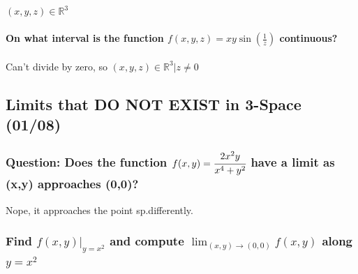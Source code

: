 \documentclass[
  letterpaper,
  DIV=11,
  numbers=noendperiod]{scrartcl}
\let\oldparagraph\paragraph
\renewcommand{\paragraph}[1]{\oldparagraph{#1}\mbox{}}
\begin{document}
\((x, y, z) \in \mathbb{R}^3\)

\hypertarget{on-what-interval-is-the-function-fx-y-z-xysinleftfrac1zright-continuous}{%
\paragraph{\texorpdfstring{On what interval is the function
\(f(x, y, z) = xy\sin\left(\frac{1}{z}\right)\)
continuous?}{On what interval is the function f(x, y, z) = xy\textbackslash sin\textbackslash left(\textbackslash frac\{1\}\{z\}\textbackslash right) continuous?}}\label{on-what-interval-is-the-function-fx-y-z-xysinleftfrac1zright-continuous}}

Can't divide by zero, so \((x, y, z) \in \mathbb{R}^3 | z \ne 0\)

\hypertarget{limits-that-do-not-exist-in-3-space-0108}{%
\subsection{Limits that DO NOT EXIST in 3-Space
(01/08)}\label{limits-that-do-not-exist-in-3-space-0108}}

\hypertarget{question-does-the-function-fxy-cfrac2x2yx4y2-have-a-limit-as-xy-approaches-00}{%
\subsubsection{\texorpdfstring{Question: Does the function
\(f(x,y) = \cfrac{2x^2y}{x^4+y^2}\) have a limit as (x,y) approaches
(0,0)?}{Question: Does the function f(x,y) = \textbackslash cfrac\{2x\^{}2y\}\{x\^{}4+y\^{}2\} have a limit as (x,y) approaches (0,0)?}}\label{question-does-the-function-fxy-cfrac2x2yx4y2-have-a-limit-as-xy-approaches-00}}

Nope, it approaches the point sp.differently.

\hypertarget{find-left.fx-yrightvert_yx2-and-compute-lim_x-y-rightarrow-0-0-fx-y-along-yx2}{%
\subsubsection{\texorpdfstring{Find \(\left.f(x, y)\right\vert_{y=x^2}\)
and compute \(\lim_{(x, y) \rightarrow (0, 0)} f(x, y)\) along
\(y=x^2\)}{Find \textbackslash left.f(x, y)\textbackslash right\textbackslash vert\_\{y=x\^{}2\} and compute \textbackslash lim\_\{(x, y) \textbackslash rightarrow (0, 0)\} f(x, y) along y=x\^{}2}}\label{find-left.fx-yrightvert_yx2-and-compute-lim_x-y-rightarrow-0-0-fx-y-along-yx2}}
\end{document}
